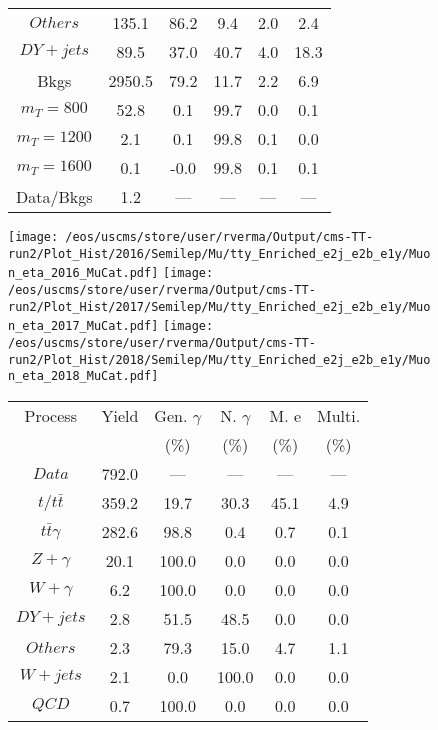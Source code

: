\begin{figure}
\begin{minipage}[c]{0.32\textwidth}
{\begin{tabular}{cccccc}
$ Others $ &  135.1 &  86.2 &  9.4 &  2.0 &  2.4\\
$ DY+jets $ &  89.5 &  37.0 &  40.7 &  4.0 &  18.3\\
Bkgs &  2950.5 &  79.2 &  11.7 &  2.2 &  6.9\\
$ m_{T} = 800 $ &  52.8 &  0.1 &  99.7 &  0.0 &  0.1\\
$ m_{T} = 1200 $ &  2.1 &  0.1 &  99.8 &  0.1 &  0.0\\
$ m_{T} = 1600 $ &  0.1 &  -0.0 &  99.8 &  0.1 &  0.1\\
Data/Bkgs &  1.2 &  --- &  --- &  --- &  ---\\
\hline
\end{tabular}
}
\end{minipage}
\end{figure}

\begin{figure}
\centering
\texttt{[image: /eos/uscms/store/user/rverma/Output/cms-TT-run2/Plot\_Hist/2016/Semilep/Mu/tty\_Enriched\_e2j\_e2b\_e1y/Muon\_eta\_2016\_MuCat.pdf]}
\texttt{[image: /eos/uscms/store/user/rverma/Output/cms-TT-run2/Plot\_Hist/2017/Semilep/Mu/tty\_Enriched\_e2j\_e2b\_e1y/Muon\_eta\_2017\_MuCat.pdf]}
\texttt{[image: /eos/uscms/store/user/rverma/Output/cms-TT-run2/Plot\_Hist/2018/Semilep/Mu/tty\_Enriched\_e2j\_e2b\_e1y/Muon\_eta\_2018\_MuCat.pdf]}
\begin{minipage}[c]{0.32\textwidth}
\centering
\tiny{
\begin{tabular}{cccccc}
\hline
Process & Yield & Gen. $\gamma$ & N. $\gamma$ & M. e & Multi. \\
 &  & (\%) & (\%) & (\%) & (\%)  \\
\hline
                                                                      $ Data $ &  792.0 &  --- &  --- &  --- &  ---\\
$ t/t\bar{t} $ &  359.2 &  19.7 &  30.3 &  45.1 &  4.9\\
$ t\bar{t}\gamma $ &  282.6 &  98.8 &  0.4 &  0.7 &  0.1\\
$ Z+\gamma $ &  20.1 &  100.0 &  0.0 &  0.0 &  0.0\\
$ W+\gamma $ &  6.2 &  100.0 &  0.0 &  0.0 &  0.0\\
$ DY+jets $ &  2.8 &  51.5 &  48.5 &  0.0 &  0.0\\
$ Others $ &  2.3 &  79.3 &  15.0 &  4.7 &  1.1\\
$ W+jets $ &  2.1 &  0.0 &  100.0 &  0.0 &  0.0\\
$ QCD $ &  0.7 &  100.0 &  0.0 &  0.0 &  0.0\\

\end{tabular}}
\end{minipage}
\end{figure}
